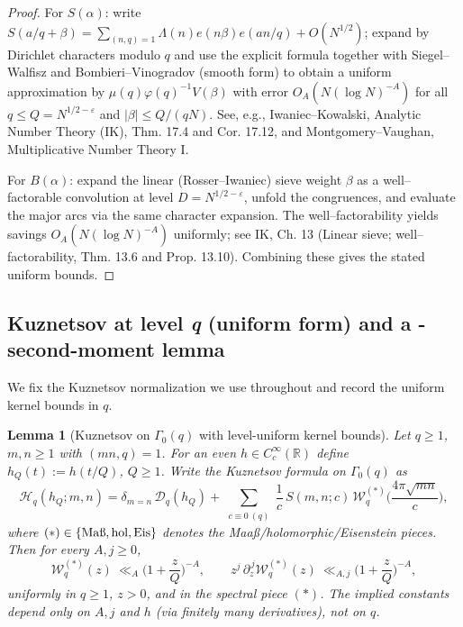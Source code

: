 \documentclass[11pt]{article}
\newtheorem{lemma}{Lemma}[part]
\theoremstyle{definition}
\theoremstyle{remark}
\numberwithin{equation}{part}
\begin{document}
\begin{proof}
	For $S(\alpha)$: write $S(a/q+\beta)=\sum_{(n,q)=1}\Lambda(n)e(n\beta)e(an/q)+O(N^{1/2})$; expand by Dirichlet characters modulo $q$ and use the explicit formula together with Siegel--Walfisz and Bombieri--Vinogradov (smooth form) to obtain a uniform approximation by $\mu(q)\varphi(q)^{-1}V(\beta)$ with error $O_A(N(\log N)^{-A})$ for all $q\le Q=N^{1/2-\varepsilon}$ and $|\beta|\le Q/(qN)$. See, e.g., Iwaniec--Kowalski, Analytic Number Theory (IK), Thm. 17.4 and Cor. 17.12, and Montgomery--Vaughan, Multiplicative Number Theory I.

	For $B(\alpha)$: expand the linear (Rosser--Iwaniec) sieve weight $\beta$ as a well--factorable convolution at level $D=N^{1/2-\varepsilon}$, unfold the congruences, and evaluate the major arcs via the same character expansion. The well--factorability yields savings $O_A(N(\log N)^{-A})$ uniformly; see IK, Ch. 13 (Linear sieve; well--factorability, Thm. 13.6 and Prop. 13.10). Combining these gives the stated uniform bounds.
\end{proof}

\subsection{Kuznetsov at level \textit q (uniform form) and a \textDelta-second-moment lemma}

We fix the Kuznetsov normalization we use throughout and record the uniform kernel bounds in $q$.

\begin{lemma}[Kuznetsov on $\Gamma_0(q)$ with level-uniform kernel bounds]\label{lem:kuznetsov-uniform-kernel}
	Let $q\ge1$, $m,n\ge1$ with $(mn,q)=1$. For an even $h\in C_c^\infty(\mathbb R)$ define $h_Q(t):=h(t/Q)$, $Q\ge1$. Write the Kuznetsov formula on $\Gamma_0(q)$ as
	\[
		\mathcal{H}_q(h_Q;m,n)
		=\delta_{m=n}\,\mathcal D_q(h_Q)
		+ \sum_{\substack{c\equiv 0\ (q)}} \frac{1}{c}\,S(m,n;c)\,\mathcal W_{q}^{(*)}\!\Big(\frac{4\pi\sqrt{mn}}{c}\Big),
	\]
	where $(*)\in\{\mathrm{Ma\text\ss},\mathrm{hol},\mathrm{Eis}\}$ denotes the Maa\ss/holomorphic/Eisenstein pieces. Then for every $A,j\ge0$,
	\[
		\mathcal W_{q}^{(*)}(z)\ \ll_A \Big(1+\frac{z}{Q}\Big)^{-A},\qquad
		z^j\,\partial_z^{\,j}\mathcal W_{q}^{(*)}(z)\ \ll_{A,j} \Big(1+\frac{z}{Q}\Big)^{-A},
	\]
	uniformly in $q\ge1$, $z>0$, and in the spectral piece $(*)$. The implied constants depend only on $A,j$ and $h$ (via finitely many derivatives), not on $q$.
\end{lemma}
\end{document}
